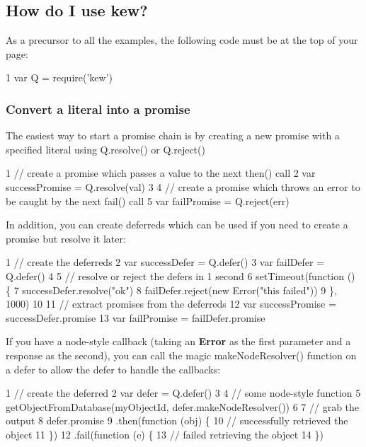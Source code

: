 \subsection*{How do I use {\bfseries kew}? }

As a precursor to all the examples, the following code must be at the top of your page\+:


\begin{DoxyCode}
1 var Q = require('kew')
\end{DoxyCode}


\subsubsection*{Convert a literal into a promise}

The easiest way to start a promise chain is by creating a new promise with a specified literal using Q.\+resolve() or Q.\+reject()


\begin{DoxyCode}
1 // create a promise which passes a value to the next then() call
2 var successPromise = Q.resolve(val)
3 
4 // create a promise which throws an error to be caught by the next fail() call
5 var failPromise = Q.reject(err)
\end{DoxyCode}


In addition, you can create deferreds which can be used if you need to create a promise but resolve it later\+:


\begin{DoxyCode}
1 // create the deferreds
2 var successDefer = Q.defer()
3 var failDefer = Q.defer()
4 
5 // resolve or reject the defers in 1 second
6 setTimeout(function () \{
7   successDefer.resolve("ok")
8   failDefer.reject(new Error("this failed"))
9 \}, 1000)
10 
11 // extract promises from the deferreds
12 var successPromise = successDefer.promise
13 var failPromise = failDefer.promise
\end{DoxyCode}


If you have a node-\/style callback (taking an {\bfseries Error} as the first parameter and a response as the second), you can call the magic {\ttfamily make\+Node\+Resolver()} function on a defer to allow the defer to handle the callbacks\+:


\begin{DoxyCode}
1 // create the deferred
2 var defer = Q.defer()
3 
4 // some node-style function
5 getObjectFromDatabase(myObjectId, defer.makeNodeResolver())
6 
7 // grab the output
8 defer.promise
9   .then(function (obj) \{
10     // successfully retrieved the object
11   \})
12   .fail(function (e) \{
13     // failed retrieving the object
14   \})
\end{DoxyCode}


